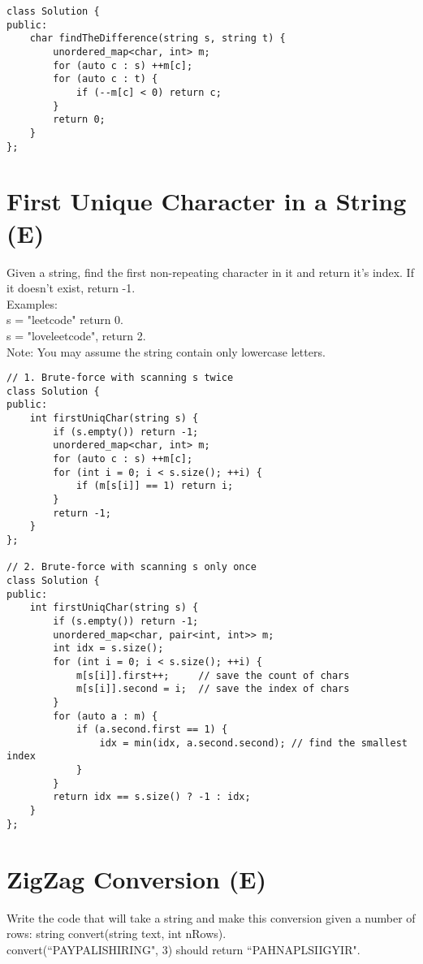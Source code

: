 \begin{lstlisting}
class Solution {
public:
    char findTheDifference(string s, string t) {
        unordered_map<char, int> m;
        for (auto c : s) ++m[c];
        for (auto c : t) {
            if (--m[c] < 0) return c;
        }
        return 0;
    }
};
\end{lstlisting}


\section{First Unique Character in a String (E)}
Given a string, find the first non-repeating character in it and return it's index. If it doesn't exist, return -1.\\

Examples:\\
s = "leetcode"
return 0.\\
s = "loveleetcode",
return 2.\\

Note: You may assume the string contain only lowercase letters. \\

\begin{lstlisting}
// 1. Brute-force with scanning s twice
class Solution {
public:
    int firstUniqChar(string s) {
        if (s.empty()) return -1;
        unordered_map<char, int> m;
        for (auto c : s) ++m[c];
        for (int i = 0; i < s.size(); ++i) {
            if (m[s[i]] == 1) return i;
        }
        return -1;
    }
};

// 2. Brute-force with scanning s only once
class Solution {
public:
    int firstUniqChar(string s) {
        if (s.empty()) return -1;
        unordered_map<char, pair<int, int>> m;
        int idx = s.size();
        for (int i = 0; i < s.size(); ++i) {
            m[s[i]].first++;     // save the count of chars
            m[s[i]].second = i;  // save the index of chars
        }
        for (auto a : m) {
            if (a.second.first == 1) {
                idx = min(idx, a.second.second); // find the smallest index
            }
        }
        return idx == s.size() ? -1 : idx;
    }
};
\end{lstlisting}


\section{ZigZag Conversion (E)}
Write the code that will take a string and make this conversion given a number of rows: string convert(string text, int nRows). \\
convert(``PAYPALISHIRING", 3) should return ``PAHNAPLSIIGYIR". \\

